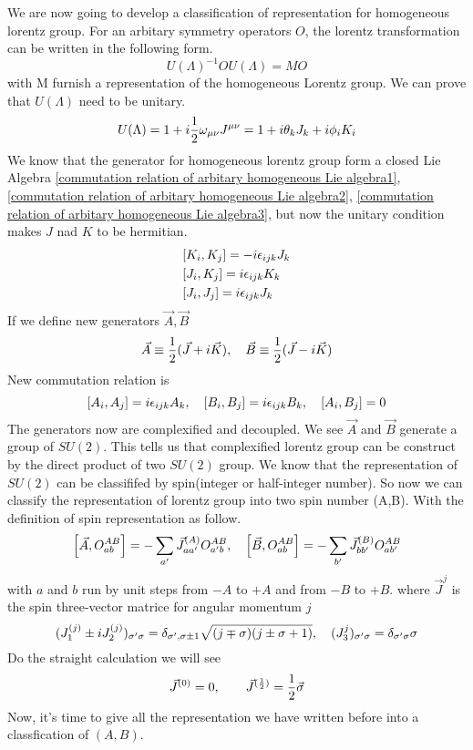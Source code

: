 We are now going to develop a classification of representation for homogeneous lorentz group. For an arbitary symmetry operators $O$, the lorentz transformation can be written in the following form.
\begin{equation}
U(\Lambda)^{-1} O U(\Lambda) = M O
\end{equation}
with M furnish a representation of the homogeneous Lorentz group. We can prove that $U(\Lambda)$ need to be unitary.
\begin{equation}\label{infinitesimal form of ULa}
U(\Lambda) = 1 +  i\frac{1}{2} \omega_{\mu\nu}J^{\mu\nu}
=1 +  i \theta_k J_k + i \phi_iK_i
\end{equation}
We know that the generator for homogeneous lorentz group form a closed Lie Algebra \eqref{commutation relation of arbitary homogeneous Lie algebra1}, \eqref{commutation relation of arbitary homogeneous Lie algebra2}, \eqref{commutation relation of arbitary homogeneous Lie algebra3}, but now the unitary condition makes $J$ nad $K$ to be hermitian. 
\begin{align}
&[K_i,K_j] = -i \epsilon_{ijk} J_k
\\
&[J_i,K_j] = i \epsilon_{ijk} K_k
\\
&[J_i,J_j] = i \epsilon_{ijk} J_k
\end{align}
If we define new generators $\vec{A}, \vec{B}$
\begin{equation}
\vec{A} \equiv \frac{1}{2}(\vec{J}+i\vec{K}),\quad
\vec{B} \equiv \frac{1}{2}(\vec{J}-i\vec{K})
\end{equation}
New commutation relation is
\begin{equation}\label{commutation relation of A and B}
\comm{A_i}{A_j} = i \e_{ijk} A_k,\quad
\comm{B_i}{B_j} = i \e_{ijk} B_k,\quad
\comm{A_i}{B_j} = 0
\end{equation}
The generators now are complexified and decoupled. We see $\vec{A}$ and $\vec{B}$ generate a group of $SU(2)$. This tells us that complexified lorentz group can be construct by the direct product of two $SU(2)$ group. We know that the representation of $SU(2)$ can be classififed by spin(integer or half-integer number). So now we can classify the representation of lorentz group into two spin number (A,B). With the definition of spin representation as follow.
\begin{equation}\label{the definition of spin representation}
\comm{\vec{A}}{O_{ab}^{AB}} = -\sum_{a'}\vec{J}^{(A)}_{aa'}O^{AB}_{a'b},\quad
\comm{\vec{B}}{O_{ab}^{AB}} = -\sum_{b'}\vec{J}^{(B)}_{bb'}O^{AB}_{ab'}
\end{equation}
with $a$ and $b$ run by unit steps from $-A$ to $+A$ and from $-B$ to $+B$. where $\vec{J}^{j}$ is the spin three-vector  matrice for angular momentum $j$
\begin{equation}\label{three vector matrice for angular momentum}
(J_1^{(j)}\pm i J_2^{(j)})_{\sigma'\sigma} = \delta_{\sigma',\sigma\pm 1}
\sqrt{(j\mp\sigma)(j\pm\sigma+1)},\quad
(J_3^{j})_{\sigma'\sigma} = \delta_{\sigma'\sigma} \sigma
\end{equation}
Do the straight calculation we will see
\begin{equation}
\vec{J}^{(0)} = 0, \qquad
\vec{J}^{(\frac{1}{2})} = \frac{1}{2} \vec{\sigma}
\end{equation}
Now, it's time to give all the representation we have written before into a classfication of $(A,B)$.

